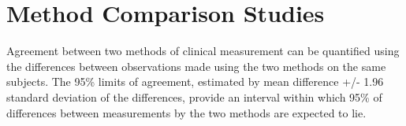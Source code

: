 \documentclass{report}
\begin{document}
\section{Method Comparison Studies}

Agreement between two methods of clinical measurement can be quantified using the differences between observations made using the two methods on the same subjects. The 95\% limits of agreement, estimated by mean difference +/- 1.96 standard deviation of the differences, provide an interval within which 95\% of differences between measurements by the two methods are expected to lie.



\end{document}
